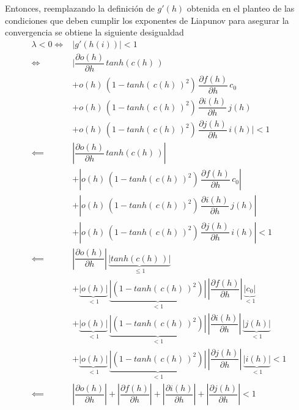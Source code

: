 \documentclass{article}
\begin{document}
\begin{appendices}
		Entonces, reemplazando la definición de $g'(h)$ obtenida en el planteo de las condiciones que deben cumplir los exponentes de Liapunov para asegurar la convergencia se obtiene la siguiente desigualdad
		\begin{equation*}
		\begin{split}
		\lambda < 0 \iff&  |g'(h(i))|  < 1 \\
		\iff& | \dfrac{\partial o(h)}{\partial h} \, tanh( c(h) \, )\\
		&+ o(h) \, (1 - tanh( \, c(h) \, )^2) \, \dfrac{\partial f(h)}{\partial h} \, c_0\\
		&+ o(h) \, (1 - tanh( \, c(h) \, )^2) \, \dfrac{\partial i(h)}{\partial h} \, j(h)\\
		&+ o(h) \, (1 - tanh( \, c(h) \, )^2) \, \dfrac{\partial j(h)}{\partial h} \, i(h) | < 1\\
		\impliedby & \left\lvert \dfrac{\partial o(h)}{\partial h} \, tanh( c(h) \, )\right\rvert \\
		&+ \left\lvert o(h) \, (1 - tanh( \, c(h) \, )^2) \, \dfrac{\partial f(h)}{\partial h} \, c_0 \right\rvert\\
		&+\left\lvert  o(h) \, (1 - tanh( \, c(h) \, )^2) \, \dfrac{\partial i(h)}{\partial h} \, j(h) \right\rvert \\
		&+ \left\lvert o(h) \, (1 - tanh( \, c(h) \, )^2) \, \dfrac{\partial j(h)}{\partial h} \, i(h) \right\rvert < 1\\
		\impliedby & \left\lvert \dfrac{\partial o(h)}{\partial h} \right\rvert \, \underbrace{| tanh( c(h) \, )|}_{\le1} \\
		&+ \underbrace{| o(h) |}_{< 1}\,\underbrace{| (1 - tanh( \, c(h) \, )^2) |}_{<1} \, \left\lvert \dfrac{\partial f(h)}{\partial h} \right\rvert \, \underbrace{| c_0|}_{<1} \\
		&+ \underbrace{| o(h) |}_{< 1}\,\underbrace{| (1 - tanh( \, c(h) \, )^2) |}_{<1} \, \left\lvert \dfrac{\partial i(h)}{\partial h} \right\rvert \, \underbrace{| j(h)|}_{<1} \\
		&+ \underbrace{| o(h) |}_{< 1}\,\underbrace{| (1 - tanh( \, c(h) \, )^2) |}_{<1} \, \left\lvert \dfrac{\partial j(h)}{\partial h} \right\rvert \, \underbrace{| i(h)| }_{<1}< 1\\
		\impliedby & \left\lvert \dfrac{\partial o(h)}{\partial h} \right\rvert + \left\lvert \dfrac{\partial f(h)}{\partial h} \right\rvert + \left\lvert \dfrac{\partial i(h)}{\partial h} \right\rvert + \left\lvert \dfrac{\partial j(h)}{\partial h} \right\rvert <1
		\end{split}

\end{equation*}
\end{appendices}
\end{document}
